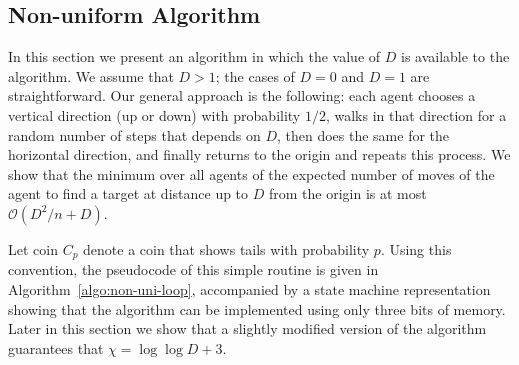 \documentclass[11pt]{article}
\newcommand{\BO}{\mathcal{O}}
\begin{document}
\subsection{Non-uniform Algorithm}
\label{sec:non-uniform}

In this section we present an algorithm in which the value of $D$ is available to the algorithm. We assume that $D > 1$; the cases of $D=0$ and $D=1$ are straightforward. Our general approach is the following: each agent chooses a vertical direction (up or down) with probability $1/2$, walks in that direction for a random number of steps that depends on $D$, then does the same for the horizontal direction, and finally returns to the origin and repeats this process. We show that the minimum over all agents of the expected number of moves of the agent to find a target at distance up to $D$ from the origin is at most $\BO(D^2/n + D)$. 

Let coin $C_p$ denote a coin that shows tails with probability $p$. Using this convention, the pseudocode of this simple routine is given in Algorithm~\ref{algo:non-uni-loop}, accompanied by a state machine representation showing that the algorithm can be implemented using only three bits of memory. Later in this section we show that a slightly modified version of the algorithm guarantees that $\chi = \log \log D +3$.
\end{document}

